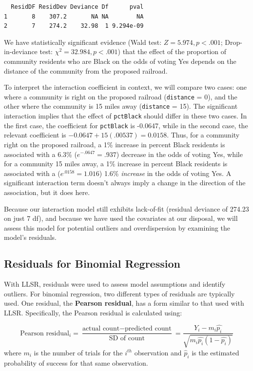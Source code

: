 \documentclass[
]{krantz}
\begin{document}
\begin{verbatim}
  ResidDF ResidDev Deviance Df      pval
1       8    307.2       NA NA        NA
2       7    274.2    32.98  1 9.294e-09
\end{verbatim}

We have statistically significant evidence (Wald test: \(Z = 5.974, p<.001\); Drop-in-deviance test: \(\chi^2=32.984, p<.001\)) that the effect of the proportion of community residents who are Black on the odds of voting Yes depends on the distance of the community from the proposed railroad.

To interpret the interaction coefficient in context, we will compare two cases: one where a community is right on the proposed railroad (\texttt{distance} = 0), and the other where the community is 15 miles away (\texttt{distance} = 15). The significant interaction implies that the effect of \texttt{pctBlack} should differ in these two cases. In the first case, the coefficient for \texttt{pctBlack} is -0.0647, while in the second case, the relevant coefficient is \(-0.0647+15(.00537) = 0.0158\). Thus, for a community right on the proposed railroad, a 1\% increase in percent Black residents is associated with a 6.3\% (\(e^{-.0647}=.937\)) decrease in the odds of voting Yes, while for a community 15 miles away, a 1\% increase in percent Black residents is associated with a (\(e^{.0158}=1.016\)) 1.6\% \emph{increase} in the odds of voting Yes. A significant interaction term doesn't always imply a change in the direction of the association, but it does here.

Because our interaction model still exhibits lack-of-fit (residual deviance of 274.23 on just 7 df), and because we have used the covariates at our disposal, we will assess this model for potential outliers and overdispersion by examining the model's residuals.

\subsection{Residuals for Binomial Regression}\label{residuals-for-binomial-regression}

With LLSR, residuals were used to assess model assumptions and identify outliers. For binomial regression, two different types of residuals are typically used. One residual, the \textbf{Pearson residual},  has a form similar to that used with LLSR. Specifically, the Pearson residual is calculated using:

\begin{equation*}
\textrm{Pearson residual}_i = \frac{\textrm{actual count}-\textrm{predicted count}}{\textrm{SD of count}} =
\frac{Y_i-m_i\hat{p_i}}{\sqrt{m_i\hat{p_i}(1-\hat{p_i})}}
\end{equation*}
where \(m_i\) is the number of trials for the \(i^{th}\) observation and \(\hat{p}_i\) is the estimated probability of success for that same observation.
\end{document}
